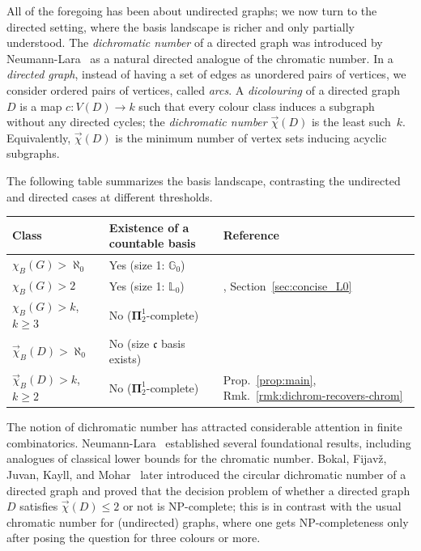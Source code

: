 All of the foregoing has been about undirected graphs; we now turn to the directed setting, where the basis landscape is richer and only partially understood.
The \emph{dichromatic number} of a directed graph was introduced by Neumann-Lara~\cite{NeumannLara1982} as a natural directed analogue of the chromatic number.
In a \emph{directed graph}, instead of having a set of edges as unordered pairs of vertices, we consider ordered pairs of vertices, called \emph{arcs}.
A \emph{dicolouring} of a directed graph~$D$ is a map $c\colon V(D)\to k$ such that every colour class induces a subgraph without any directed cycles; the \emph{dichromatic number} $\vec\chi(D)$ is the least such~$k$.
Equivalently, $\vec\chi(D)$ is the minimum number of vertex sets inducing acyclic subgraphs.

The following table summarizes the basis landscape, contrasting the undirected and directed cases at different thresholds.

\medskip
\begin{center}
\begin{tabular}{lll}
	\hline
	\textbf{Class} & \textbf{Existence of a countable basis} & \textbf{Reference} \\
	\hline
	$\chi_B(G) > \aleph_0$ & Yes (size 1: $\mathbb{G}_0$) & \cite{kechris1999borel} \\
	$\chi_B(G) > 2$ & Yes (size 1: $\mathbb{L}_0$) & \cite{L0paper}, Section~\ref{sec:concise_L0} \\
	$\chi_B(G) > k$, $k\geq 3$ & No ($\mathbf\Pi^1_2$-complete) & \cite{Todorcevic_2021_ComplexProbBorel} \\
	\hline
	$\vec\chi_B(D) > \aleph_0$ & No (size $\mathfrak{c}$ basis exists) & \cite{RaghavanXiao2024} \\
	$\vec\chi_B(D) > k$, $k\geq 2$ & No ($\mathbf\Pi^1_2$-complete) & Prop.~\ref{prop:main}, Rmk.~\ref{rmk:dichrom-recovers-chrom} \\
	\hline
\end{tabular}
\end{center}

The notion of dichromatic number has attracted considerable attention in finite combinatorics.
Neumann-Lara~\cite{NeumannLara1982} established several foundational results, including analogues of classical lower bounds for the chromatic number.
Bokal, Fijav{\v{z}}, Juvan, Kayll, and Mohar~\cite{Bokal_2004_CircularChrom} later introduced the circular dichromatic number of a directed graph and proved that the decision problem of whether a directed graph $D$ satisfies $\vec\chi(D)\leq 2$ or not is NP-complete; this is in contrast with the usual chromatic number for (undirected) graphs, where one gets NP-completeness only after posing the question for three colours or more.

